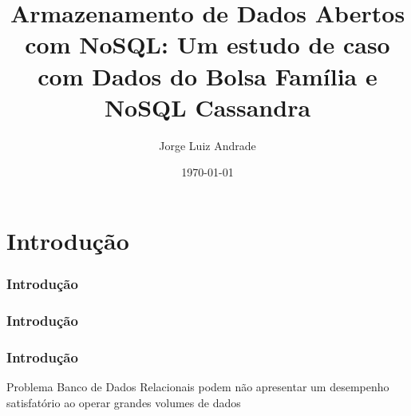 \documentclass[brazil]{beamer}
\title[Bolsa Família e Cassandra]{Armazenamento de Dados Abertos com NoSQL: Um estudo de caso com Dados do Bolsa Família e NoSQL Cassandra} %
\author{Jorge Luiz Andrade} %
\institute[UnB] %
{
Universidade de Brasília \\ %
\medskip
\textit{jorgeluizandrade@outlook.com} %
}
\date{\today} %
\begin{document}
\begin{frame}
\titlepage %
\end{frame}



\section{Introdução} 
\begin{frame}

\frametitle{Introdução}
\end{frame}

\begin{frame}
\frametitle{Introdução}

\end{frame}

\begin{frame}
\frametitle{Introdução}
\vfill


\begin{block}{Problema}
	Banco de Dados Relacionais podem não apresentar um desempenho satisfatório ao operar grandes volumes de dados
\end{block}
\vfill

\vfill

\end{frame}
\end{document}
